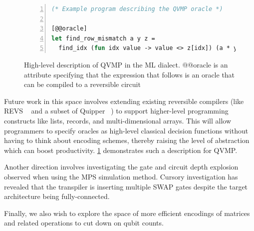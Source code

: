 \documentclass[11pt]{article}
\theoremstyle{definition}
\theoremstyle{remark}
\begin{document}
\begin{figure}
  \begin{lstlisting}[frame=single,language=ML, numbers=left]
(* Example program describing the QVMP oracle *)

[@@oracle]
let find_row_mismatch a y z =
  find_idx (fun idx value -> value <> z[idx]) (a * y)
  \end{lstlisting}
  \caption{High-level description of QVMP in the ML dialect.
  @@oracle is an attribute specifying that the expression that
  follows is an oracle that can be compiled to a reversible circuit}
  \label{fig:high_level_qvmp_oracle}
\end{figure}

Future work in this space involves extending existing reversible compilers (like
REVS ~\cite{amy2017verified} and a subset of Quipper ~\cite{green2013quipper}) to
support higher-level programming constructs like lists, records, and
multi-dimensional arrays. This will allow programmers to specify oracles as
high-level classical decision functions without having to think about encoding
schemes, thereby raising the level of abstraction which can boost productivity.
\cref{fig:high_level_qvmp_oracle} demonstrates such a description for QVMP.

Another direction involves investigating the gate and circuit depth
explosion observed when using the MPS simulation method. Cursory
investigation has revealed that the transpiler is inserting multiple SWAP gates
despite the target architecture being fully-connected.

Finally, we also wish to explore the space of more efficient encodings of
matrices and related operations to cut down on qubit counts.

\newpage

\printbibliography[title=Bibliography]
\end{document}

